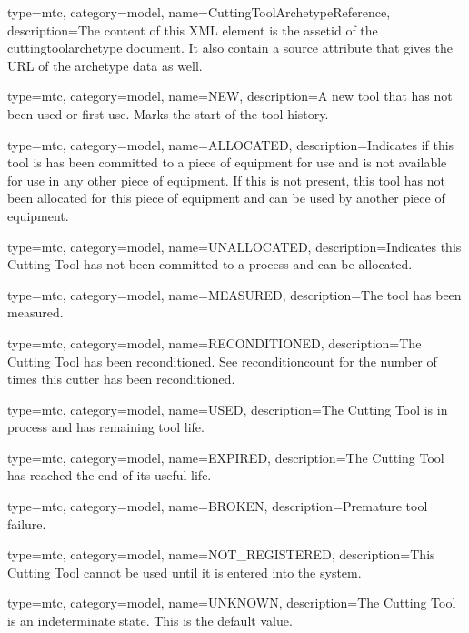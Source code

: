 {
  type=mtc,
  category=model,
  name={CuttingToolArchetypeReference},
  description={The content of this XML element is the \gls{assetid} of the \gls{cuttingtoolarchetype} document. It \MAY also contain a source attribute that gives the URL of the archetype data as well.}
}


{
  type=mtc,
  category=model,
  name={NEW},
  description={A new tool that has not been used or first use. Marks the start of the tool history.}
}



{
  type=mtc,
  category=model,
  name={ALLOCATED},
  description={Indicates if this tool is has been committed to a piece of equipment for use and is not available for use in any other piece of equipment. If this is not present, this tool has not been allocated for this piece of equipment and can be used by another piece of equipment.}
}


{
  type=mtc,
  category=model,
  name={UNALLOCATED},
  description={Indicates this Cutting Tool has not been committed to a process and can be allocated.}
}


{
  type=mtc,
  category=model,
  name={MEASURED},
  description={The tool has been measured.}
}


{
  type=mtc,
  category=model,
  name={RECONDITIONED},
  description={The Cutting Tool has been reconditioned. See \gls{reconditioncount} for the number of times this cutter has been reconditioned.}
}


{
  type=mtc,
  category=model,
  name={USED},
  description={The Cutting Tool is in process and has remaining tool life.}
}


{
  type=mtc,
  category=model,
  name={EXPIRED},
  description={The Cutting Tool has reached the end of its useful life.}
}


{
  type=mtc,
  category=model,
  name={BROKEN},
  description={Premature tool failure.}
}


{
  type=mtc,
  category=model,
  name={NOT\_REGISTERED},
  description={This Cutting Tool cannot be used until it is entered into the system.}
}


{
  type=mtc,
  category=model,
  name={UNKNOWN},
  description={The Cutting Tool is an indeterminate state. This is the default value.}
}


